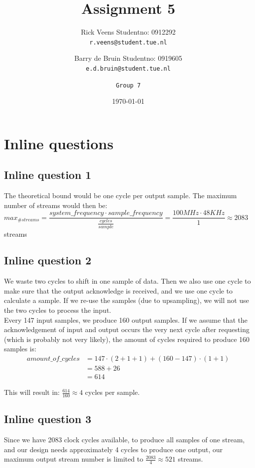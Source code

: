 \documentclass[a4paper,twoside,11pt, fleqn]{article}
\title{\vspace{-\baselineskip}\sffamily\bfseries Assignment 5}
\author{
	Rick Veens \qquad Studentno: 0912292\\
	\texttt{r.veens@student.tue.nl}
	\and
	Barry de Bruin \qquad Studentno: 0919605\\
	\texttt{e.d.bruin@student.tue.nl}
	\and
	\texttt{Group 7}
}
\date{\today}
\begin{document}
\maketitle
\newpage

\tableofcontents

\newpage
\section{Inline questions}
\subsection{Inline question 1}
The theoretical bound would be one cycle per output sample. The maximum number of streams would then be:\\

$max_{\# streams} = \dfrac{system\_frequency \cdot sample\_frequency}{\frac{cycles}{sample}} = \dfrac{100MHz \cdot 48KHz}{1} \approx 2083$ streams\\

\subsection{Inline question 2}
We waste two cycles to shift in one sample of data. Then we also use one cycle to make sure that the output acknowledge is received, and we use one cycle to calculate a sample. If we re-use the samples (due to upsampling), we will not use the two cycles to process the input.\\

Every 147 input samples, we produce 160 output samples. If we assume that the acknowledgement of input and output occurs the very next cycle after requesting (which is probably not very likely), the amount of cycles required to produce 160 samples is:
\begin{align*}
amount\_of\_cycles &= 147\cdot (2 + 1 + 1) + (160-147)\cdot (1  + 1 )\\
&= 588 + 26\\
&= 614
\end{align*}

This will result in: $\frac{614}{160} \approx 4$ cycles per sample. 

\subsection{Inline question 3}
Since we have 2083 clock cycles available, to produce all samples of one stream, and our design needs approximately 4 cycles to produce one output, our maximum output stream number is limited to $\frac{2083}{4} \approx 521$ streams.
\end{document}
